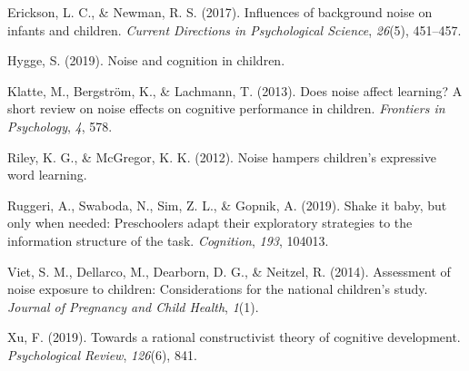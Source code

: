 \documentclass[10pt, letterpaper]{article}
\begin{document}
\leavevmode\hypertarget{ref-erickson2017}{}%
Erickson, L. C., \& Newman, R. S. (2017). Influences of background noise
on infants and children. \emph{Current Directions in Psychological
Science}, \emph{26}(5), 451--457.

\leavevmode\hypertarget{ref-hygge2019}{}%
Hygge, S. (2019). Noise and cognition in children.

\leavevmode\hypertarget{ref-klatte2013}{}%
Klatte, M., Bergström, K., \& Lachmann, T. (2013). Does noise affect
learning? A short review on noise effects on cognitive performance in
children. \emph{Frontiers in Psychology}, \emph{4}, 578.

\leavevmode\hypertarget{ref-riley2012}{}%
Riley, K. G., \& McGregor, K. K. (2012). Noise hampers children's
expressive word learning.

\leavevmode\hypertarget{ref-ruggeri2019}{}%
Ruggeri, A., Swaboda, N., Sim, Z. L., \& Gopnik, A. (2019). Shake it
baby, but only when needed: Preschoolers adapt their exploratory
strategies to the information structure of the task. \emph{Cognition},
\emph{193}, 104013.

\leavevmode\hypertarget{ref-viet2014}{}%
Viet, S. M., Dellarco, M., Dearborn, D. G., \& Neitzel, R. (2014).
Assessment of noise exposure to children: Considerations for the
national children's study. \emph{Journal of Pregnancy and Child Health},
\emph{1}(1).

\leavevmode\hypertarget{ref-xu2019}{}%
Xu, F. (2019). Towards a rational constructivist theory of cognitive
development. \emph{Psychological Review}, \emph{126}(6), 841.


\end{document}
